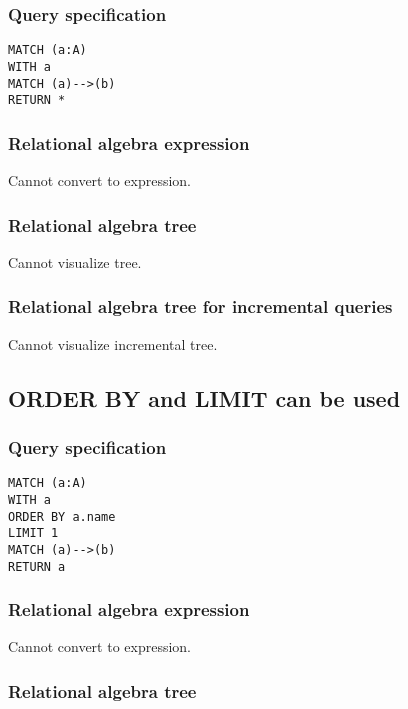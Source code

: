 \subsubsection*{Query specification}

\begin{lstlisting}
MATCH (a:A)
WITH a
MATCH (a)-->(b)
RETURN *
\end{lstlisting}

\subsubsection*{Relational algebra expression}

Cannot convert to expression.

\subsubsection*{Relational algebra tree}

Cannot visualize tree.

\subsubsection*{Relational algebra tree for incremental queries}

Cannot visualize incremental tree.

\subsection{ORDER BY and LIMIT can be used}

\subsubsection*{Query specification}

\begin{lstlisting}
MATCH (a:A)
WITH a
ORDER BY a.name
LIMIT 1
MATCH (a)-->(b)
RETURN a
\end{lstlisting}

\subsubsection*{Relational algebra expression}

Cannot convert to expression.

\subsubsection*{Relational algebra tree}

